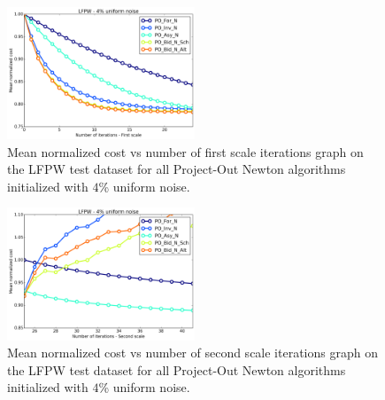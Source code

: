 \begin{figure}[h!]
    \centering
    \includegraphics[width=0.50\textwidth]{experiments/algorithms/po_n/mean_cost_vs_iters1_po_n_4.png}
    \caption{Mean normalized cost vs number of first scale iterations graph on the LFPW test dataset for all Project-Out Newton algorithms initialized with $4$\% uniform noise.}
    \label{fig:mean_cost_vs_iters1_po_n_4}
\end{figure}

\begin{figure}[h!]
    \centering
    \includegraphics[width=0.50\textwidth]{experiments/algorithms/po_n/mean_cost_vs_iters2_po_n_4.png}
    \caption{Mean normalized cost vs number of second scale iterations graph on the LFPW test dataset for all Project-Out Newton algorithms initialized with $4$\% uniform noise.}
    \label{fig:mean_cost_vs_iters2_po_n_4}
\end{figure}








